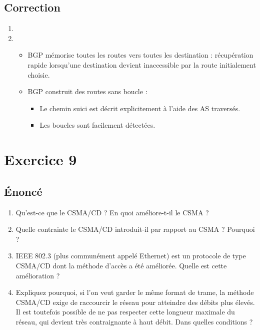 \documentclass[a4paper, 11pt, titlepage]{article}
\begin{document}
\subsection{Correction}
\begin{enumerate}[label=(\alph*)]
\item 

\item
\begin{itemize}
\item BGP mémorise toutes les routes vers toutes les destination : récupération rapide lorsqu'une destination devient inaccessible par la route initialement choisie.
\item BGP construit des routes sans boucle : \begin{itemize}
\item Le chemin suici est décrit explicitement à l'aide des AS traversés.
\item Les boucles sont facilement détectées.
\end{itemize}
\end{itemize}


\end{enumerate}



\section{Exercice 9}
\subsection{\'Enoncé}
\begin{enumerate}[label=(\alph*)]
  \item Qu’est-ce que le CSMA/CD ? En quoi améliore-t-il le CSMA ?
  \item Quelle contrainte le CSMA/CD introduit-il par rapport au CSMA ? Pourquoi ?
  \item IEEE 802.3 (plus communément appelé Ethernet) est un protocole de type CSMA/CD dont la méthode d'accès a été améliorée. Quelle est cette amélioration ?
  \item Expliquez pourquoi, si l’on veut garder le même format de trame, la méthode CSMA/CD exige de raccourcir le réseau pour atteindre des débits plus élevés. Il est toutefois possible de ne pas respecter cette longueur maximale du réseau, qui devient très contraignante à haut débit. Dans quelles conditions ?
\end{enumerate}
\end{document}

